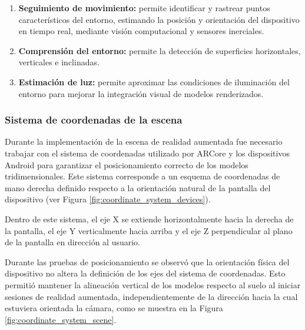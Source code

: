        \begin{enumerate}

            \item \textbf{Seguimiento de movimiento:} permite identificar y rastrear puntos característicos del entorno, estimando la posición y orientación del dispositivo en tiempo real, mediante visión computacional y sensores inerciales. 
            
            \item \textbf{Comprensión del entorno:} permite la detección de superficies horizontales, verticales e inclinadas.

            \item \textbf{Estimación de luz:} permite aproximar las condiciones de iluminación del entorno para mejorar la integración visual de modelos renderizados.

        \end{enumerate}

        \subsubsection{Sistema de coordenadas de la escena}

            Durante la implementación de la escena de realidad aumentada fue necesario trabajar con el sistema de coordenadas utilizado por ARCore y los dispositivos Android para garantizar el posicionamiento correcto de los modelos tridimensionales. Este sistema corresponde a un esquema de coordenadas de mano derecha definido respecto a la orientación natural de la pantalla del dispositivo (ver Figura \ref{fig:coordinate_system_devices}).

            Dentro de este sistema, el eje X se extiende horizontalmente hacia la derecha de la pantalla, el eje Y verticalmente hacia arriba y el eje Z perpendicular al plano de la pantalla en dirección al usuario.

            
            
            Durante las pruebas de posicionamiento se observó que la orientación física del dispositivo no altera la definición de los ejes del sistema de coordenadas. Esto permitió mantener la alineación vertical de los modelos respecto al suelo al iniciar sesiones de realidad aumentada, independientemente de la dirección hacia la cual estuviera orientada la cámara, como se muestra en la Figura \ref{fig:coordinate_system_scene}.

